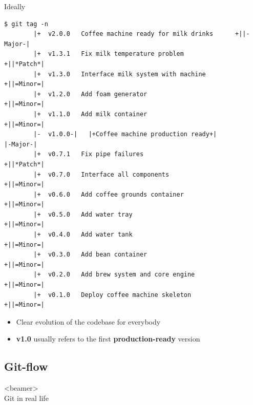 \begin{frame}[fragile]{Ideally}
    \vspace{-2mm}
    \begin{lstlisting}[style=MyBash]
        $ git tag -n
        |+  v2.0.0   Coffee machine ready for milk drinks      +||-Major-|
        |+  v1.3.1   Fix milk temperature problem              +||*Patch*|
        |+  v1.3.0   Interface milk system with machine        +||=Minor=|
        |+  v1.2.0   Add foam generator                        +||=Minor=|
        |+  v1.1.0   Add milk container                        +||=Minor=|
        |-  v1.0.0-|   |+Coffee machine production ready+|           |-Major-|
        |+  v0.7.1   Fix pipe failures                         +||*Patch*|
        |+  v0.7.0   Interface all components                  +||=Minor=|
        |+  v0.6.0   Add coffee grounds container              +||=Minor=|
        |+  v0.5.0   Add water tray                            +||=Minor=|
        |+  v0.4.0   Add water tank                            +||=Minor=|
        |+  v0.3.0   Add bean container                        +||=Minor=|
        |+  v0.2.0   Add brew system and core engine           +||=Minor=|
        |+  v0.1.0   Deploy coffee machine skeleton            +||=Minor=|
    \end{lstlisting}
    \begin{itemize}
        \item Clear evolution of the codebase for everybody
        \item \textbf{v1.0} usually refers to the first \textbf{production-ready} version
    \end{itemize}
\end{frame}


\subsection{Git-flow}
\begin{frame}<beamer>{\\ \colorbox{PP}{}\;Git in real life}
    \vspace{3mm}
    \tableofcontents[sections={1}, currentsection, hideothersubsections, sectionstyle=hide, subsectionstyle=show/shaded/hide, subsubsectionstyle=show]
\end{frame}
